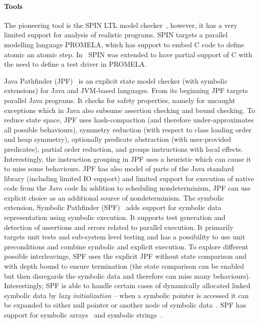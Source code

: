 \paragraph{Tools}

The pioneering tool is the SPIN LTL model
checker~, however, it has a very limited
support for analysis of realistic programs.
SPIN targets a parallel modelling language PROMELA, which has support to embed
C code to define atomic an atomic step.
In~ SPIN was extended to have partial support of C with the
need to define a test driver in PROMELA.

Java Pathfinder (JPF)~ is an explicit state model
checker (with symbolic extensions) for Java and JVM-based
languages.
From its beginning JPF targets parallel Java programs.
It checks for safety properties, namely for uncaught exceptions which in Java also subsume assertion checking and bound checking.
To reduce state space, JPF uses hash-compaction (and therefore under-approximates all possible behaviours), symmetry reduction (with respect to class loading order and heap symmetry), optionally predicate abstraction (with user-provided predicates), partial order reduction, and groups instructions with local effects.
Interestingly, the instruction grouping in JPF uses a heuristic which can cause it to miss some behaviours.
JPF has also model of parts of the Java standard library (including limited IO
support) and limited support for execution of native code from the Java
code
In addition to scheduling nondeterminism, JPF can use explicit choice as an
additional source of nondeterminism.
The symbolic extension, Symbolic Pathfinder (SPF)~ adds
support for symbolic data representation using symbolic execution.
It supports test generation and detection of assertions and errors related to parallel execution.
It primarily targets unit tests and sub-system level testing and has a
possibility to use unit preconditions and combine symbolic and explicit
execution.
To explore different possible interleavings, SPF uses the explicit JPF without
state comparison and with depth bound to ensure termination (the state
comparison can be enabled but then disregards the symbolic data and therefore
can miss many behaviours).
Interestingly, SPF is able to handle certain cases of dynamically allocated
linked symbolic data by \emph{lazy initialization} -- when a symbolic pointer
is accessed it can be expanded to either null pointer or another node of
symbolic data~.
SPF has support for symbolic arrays~ and symbolic strings~.

